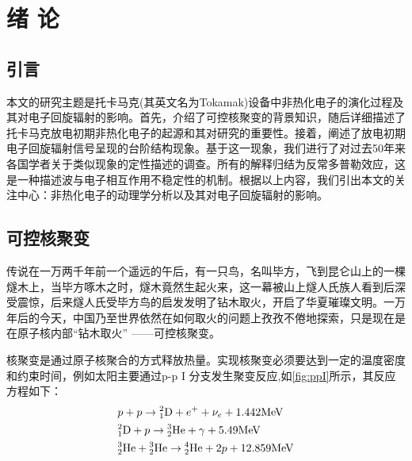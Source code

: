 
\chapter{绪 论}

\section*{引言}
本文的研究主题是托卡马克(其英文名为Tokamak)设备中非热化电子的演化过程及其对电子回旋辐射的影响。首先，介绍了可控核聚变的背景知识，随后详细描述了托卡马克放电初期非热化电子的起源和其对研究的重要性。接着，阐述了放电初期电子回旋辐射信号呈现的台阶结构现象。基于这一现象，我们进行了对过去50年来各国学者关于类似现象的定性描述的调查。所有的解释归结为反常多普勒效应\cite{RN1585}，这是一种描述波与电子相互作用不稳定性的机制。根据以上内容，我们引出本文的关注中心：非热化电子的动理学分析以及其对电子回旋辐射的影响。
\section{可控核聚变}
传说在一万两千年前一个遥远的午后，有一只鸟，名叫毕方，飞到昆仑山上的一棵燧木上，当毕方啄木之时，燧木竟然生起火来，这一幕被山上燧人氏族人看到后深受震惊，后来燧人氏受毕方鸟的启发发明了钻木取火，开启了华夏璀璨文明。一万年后的今天，中国乃至世界依然在如何取火的问题上孜孜不倦地探索，只是现在是在原子核内部“钻木取火” ——可控核聚变。\par
核聚变是通过原子核聚合的方式释放热量。实现核聚变必须要达到一定的温度密度和约束时间，例如太阳主要通过p-p I 分支发生聚变反应,如\autoref{fig:ppI}所示，其反应方程如下：
\begin{equation*}
\begin{aligned}
&p+p\to{}_1^2\text{D}+e^{+}+\nu_e+1.442{\mathrm{MeV}} \\
&{}_1^2\text{D}+p\to {}_2^3\text{He}+\gamma+5.49{\mathrm{MeV}} \\
&{}_2^3\text{He}+{}_2^3\text{He}\to{}_2^4\text{He}+2p+12.859{\mathrm{MeV}}
\end{aligned}
\end{equation*}


